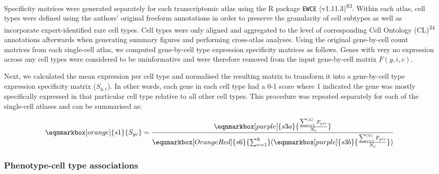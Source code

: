 \documentclass[
]{article}
\begin{document}
Specificity matrices were generated separately for each transcriptomic
atlas using the R package \texttt{EWCE} (v1.11.3)\textsuperscript{83}.
Within each atlas, cell types were defined using the authors' original
freeform annotations in order to preserve the granularity of cell
subtypes as well as incorporate expert-identified rare cell types. Cell
types were only aligned and aggregated to the level of corresponding
Cell Ontology (CL)\textsuperscript{34} annotations afterwards when
generating summary figures and performing cross-atlas analyses. Using
the original gene-by-cell count matrices from each single-cell atlas, we
computed gene-by-cell type expression specificity matrices as follows.
Genes with very no expression across any cell types were considered to
be uninformative and were therefore removed from the input gene-by-cell
matrix \(F(g,i,c)\).

Next, we calculated the mean expression per cell type and normalised the
resulting matrix to transform it into a gene-by-cell type expression
specificity matrix (\(S_{g,c}\)). In other words, each gene in each cell
type had a 0-1 score where 1 indicated the gene was mostly specifically
expressed in that particular cell type relative to all other cell types.
This procedure was repeated separately for each of the single-cell
atlases and can be summarised as:

\hfill\break

\begin{equation*}
  \eqnmarkbox[orange]{s1}{S_{gc}}
  =
  \frac{
    \eqnmarkbox[purple]{s3a}{
      \frac{
        \sum_{i=1}^{|L|} F_{gic}
      }{
        N_c  
      }
    } 
  }{
   \eqnmarkbox[OrangeRed]{s6}{\sum_{r=1}^{k}}(
     \eqnmarkbox[purple]{s3b}{
      \frac{
        \sum_{i=1}^{|L|} F_{gic}
      }{
        N_c  
      }
    } 
   ) 
  }
\end{equation*}

\hfill\break

\subsubsection{Phenotype-cell type
associations}\label{phenotype-cell-type-associations-1}
\end{document}
